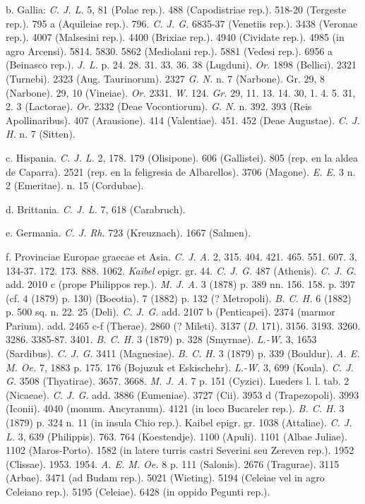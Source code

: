 \documentclass[a4paper, 11pt, oneside, polutonikogreek, german, twocolumn]{article}
\begin{document}
b. Gallia: \emph{C. J. L.} 5, 81 (Polae rep.). 488 (Capodistriae rep.). 518-20 (Tergeste rep.). 795 a (Aquileiae rep.). 796. \emph{C. J. G.} 6835-37 (Venetiis rep.). 3438 (Veronae rep.). 4007 (Malsesini rep.). 4400 (Brixiae rep.). 4940 (Cividate rep.). 4985 (in agro Arcensi). 5814. 5830. 5862 (Mediolani rep.). 5881 (Vedesi rep.). 6956 a (Beinasco rep.). \emph{J. L.} p. 24. 28. 31. 33. 36. 38 (Lugduni). \emph{Or.} 1898 (Bellici). 2321 (Turnebi). 2323 (Aug. Taurinorum). 2327 \emph{G. N.} n. 7 (Narbone). Gr. 29, 8 (Narbone). 29, 10 (Vineiae). \emph{Or.} 2331. \emph{W.} 124. \emph{Gr.} 29, 11. 13. 14. 30, 1. 4. 5. 31, 2. 3 (Lactorae). \emph{Or.} 2332 (Deae Vocontiorum). \emph{G. N.} n. 392. 393 (Reis Apollinaribus). 407 (Arausione). 414 (Valentiae). 451. 452 (Deae Augustae). \emph{C. J. H.} n. 7 (Sitten).

c. Hispania. \emph{C. J. L.} 2, 178. 179 (Olisipone). 606 (Gallistei). 805 (rep. en la aldea de Caparra). 2521 (rep. en la feligresia de Albarellos). 3706 (Magone). \emph{E. E.} 3 n. 2 (Emeritae). n. 15 (Cordubae).

d. Brittania. \emph{C. J. L.} 7, 618 (Carabruch).

e. Germania. \emph{C. J. Rh.} 723 (Kreuznach). 1667 (Salmen).

f. Provinciae Europae graecae et Asia. \emph{C. J. A.} 2, 315. 404. 421. 465. 551. 607. 3, 134-37. 172. 173. 888. 1062. \emph{Kaibel} epigr. gr. 44. \emph{C. J. G.} 487 (Athenis). \emph{C. J. G.} add. 2010 c (prope Philippos rep.). \emph{M. J. A.} 3 (1878) p. 389 nn. 156. 158. p. 397 (cf. 4 (1879) p. 130) (Boeotia). 7 (1882) p. 132 (? Metropoli). \emph{B. C. H.} 6 (1882) p. 500 sq. n. 22. 25 (Deli). \emph{C. J. G.} add. 2107 b (Penticapei). 2374 (marmor Parium). add. 2465 c-f (Therae). 2860 (? Mileti). 3137 (\emph{D.} 171). 3156. 3193. 3260. 3286. 3385-87. 3401. \emph{B. C. H.} 3 (1879) p. 328 (Smyrnae). \emph{L.-W.} 3, 1653 (Sardibus). \emph{C. J. G.} 3411 (Magnesiae). \emph{B. C. H.} 3 (1879) p. 339 (Bouldur). \emph{A. E. M. Oe.} 7, 1883 p. 175. 176 (Bojuzuk et Eskischehr). \emph{L.-W.} 3, 699 (Koula). \emph{C. J. G.} 3508 (Thyatirae). 3657. 3668. \emph{M. J. A.} 7 p. 151 (Cyzici). Lueders l. l. tab. 2 (Nicaeae). \emph{C. J. G.} add. 3886 (Eumeniae). 3727 (Cii). 3953 d (Trapezopoli). 3993 (Iconii). 4040 (monum. Ancyranum). 4121 (in loco Bucareler rep.). \emph{B. C. H.} 3 (1879) p. 324 n. 11 (in insula Chio rep.). Kaibel epigr. gr. 1038 (Attaliae). \emph{C. J. L.} 3, 639 (Philippis). 763. 764 (Koestendje). 1100 (Apuli). 1101 (Albae Juliae). 1102 (Maros-Porto). 1582 (in latere turris castri Severini seu Zereven rep.). 1952 (Clissae). 1953. 1954. \emph{A. E. M. Oe.} 8 p. 111 (Salonis). 2676 (Tragurae). 3115 (Arbae). 3471 (ad Budam rep.). 5021 (Wieting). 5194 (Celeiae vel in agro Celeiano rep.). 5195 (Celeiae). 6428 (in oppido Pegunti rep.).
\end{document}
